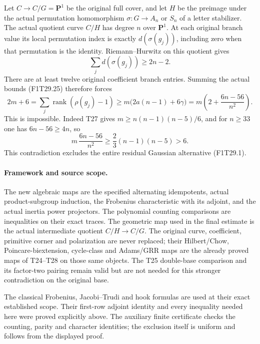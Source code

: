 Let $C\to C/G=\mathbf P^1$ be the original full cover,
and let $H$ be the preimage under the actual permutation
homomorphism $\sigma:G\to A_n$ or $S_n$ of a letter
stabilizer. The actual quotient curve $C/H$ has degree
$n$ over $\mathbf P^1$. At each original branch value
its local permutation index is exactly $d(\sigma(g_j))$,
including zero when that permutation is the identity.
Riemann--Hurwitz on this quotient gives
\[
                  \sum_j d(\sigma(g_j))\ge2n-2.
 \tag{F1T29.26}
\]
There are at least twelve original coefficient branch
entries. Summing the actual bounds (F1T29.25) therefore
forces
\[
 2m+6=\sum_j\operatorname{rank}(\rho(g_j)-1)
     \ge m\bigl(2a(n-1)+6\gamma\bigr)
     =m\left(2+\frac{6n-56}{n^2}\right).
 \tag{F1T29.27}
\]
This is impossible. Indeed T27 gives
$m\ge n(n-1)(n-5)/6$, and for $n\ge33$ one has
$6n-56\ge4n$, so
\[
       m\,\frac{6n-56}{n^2}
        \ge\frac23(n-1)(n-5)>6.
 \tag{F1T29.28}
\]
This contradiction excludes the entire residual
Gaussian alternative (F1T29.1).

\paragraph{Framework and source scope.}
The new algebraic maps are the specified alternating
idempotents, actual product-subgroup induction, the
Frobenius characteristic with its adjoint, and the actual
inertia power projectors. The polynomial counting
comparisons are inequalities on their exact traces.
The geometric map used in the final estimate is the
actual intermediate quotient $C/H\to C/G$.
The original curve, coefficient, primitive corner and
polarization are never replaced; their Hilbert/Chow,
Poincare-biextension, cycle-class and Adams/GRR maps are
the already proved maps of T24--T28 on those same objects.
The T25 double-base comparison and its factor-two
pairing remain valid but are not needed for this stronger
contradiction on the original base.

The classical Frobenius, Jacobi--Trudi and hook formulas
are used at their exact established scope. Their
first-row adjoint identity and every inequality needed
here were proved explicitly above.
The auxiliary finite certificate checks the counting,
parity and character identities; the exclusion itself is
uniform and follows from the displayed proof.
